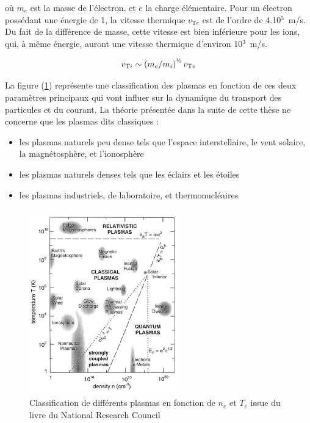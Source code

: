 \begin{refsection}
où $m_{e}$ est la masse de l'électron, et $e$ la charge élémentaire. Pour un
électron possédant une énergie de \unit{1}{\electronvolt}, la vitesse thermique
$v_{\text{T}{e}}$ est de l'ordre de 4.10$^5$~m/s.
Du fait de la différence de masse, cette vitesse est bien inférieure pour les
ions, qui, à même énergie, auront une vitesse thermique d'environ
10$^3 $~m/s.

\begin{equation}
	v_{\text{T}{i}}\sim\left(m_{e}/m_{i}\right)^{\text{\textonehalf}}
	v_{\text{T}{e}}
\end{equation}

La figure (\ref{zoologie}) représente une classification des plasmas
en fonction de ces deux paramètres principaux qui vont influer sur la dynamique du
transport des particules et du courant.
La théorie présentée dans la suite de cette thèse ne concerne que les plasmas
dits classiques :

\begin{itemize}
  \item les plasmas naturels peu dense tels que l'espace interstellaire,
  le vent solaire, la magnétosphère, et l'ionosphère
  \item les plasmas naturels denses tels que les éclairs et les étoiles
  \item les plasmas industriels, de laboratoire, et thermonucléaires
\end{itemize}

\begin{figure}[htbp]
\centering
\includegraphics[height=80mm,width=64mm]{figures/1-zoologie.png}{\caption{Classification
de différents plasmas en fonction de $n_e$ et $T_e$ issue du livre du National
Research Council \parencite{NRC}}\label{zoologie}}
\end{figure}


\end{refsection}
